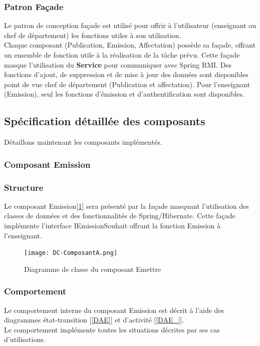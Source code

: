 \documentclass[a4paper,11pt]{article}
\newcommand{\br}{\\\mbox{}}
\begin{document}
\subsubsection{Patron Façade}
Le patron de conception façade est utilisé pour offrir à l'utilisateur (enseignant ou chef de département) les fonctions utiles à son utilisation.\br
Chaque composant (Publication, Emission, Affectation) possède sa façade, offrant un ensemble de fonction utile à la réalisation de la tâche prévu. Cette façade masque l'utilisation du \textbf{Service} pour communiquer avec Spring RMI. Des fonctions d'ajout, de suppression et de mise à jour des données sont disponibles point de vue chef de département (Publication et affectation). Pour l'enseignant (Emission), seul les fonctions d'émission et d'authentification sont disponibles.

\subsection{Spécification détaillée des composants}
Détaillons maintenant les composants implémentés.

\subsubsection{Composant Emission}

\subsubsection*{Structure}
Le composant Emission[\ref{DAE__}] sera présenté par la façade masquant l'utilisation des classes de données et des fonctionnalités de Spring/Hibernate. Cette façade implémente l'interface IEmissionSouhait offrant la fonction Emission à l'enseignant.
\begin{figure}
\centering
\texttt{[image: DC-ComposantA.png]}
\caption{Diagramme de classe du composant Emettre}
\label{DAE__}
\end{figure}

\subsubsection*{Comportement}

Le comportement interne du composant Emission est décrit à l'aide des diagrammes état-transition [\ref{DAE}] et d'activité [\ref{DAE_}].\br
Le comportement implémente toutes les situations décrites par ses cas d'utilisations.
\end{document}
